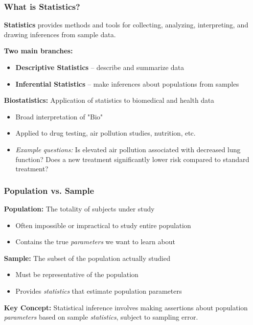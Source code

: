 \documentclass{beamer}
\begin{document}
\begin{frame}
\frametitle{What is Statistics?}
\textbf{Statistics} provides methods and tools for collecting, analyzing, interpreting, and drawing inferences from sample data.

\vspace{0.5cm}
\textbf{Two main branches:}
\begin{itemize}
\item \textbf{Descriptive Statistics} -- describe and summarize data
\item \textbf{Inferential Statistics} -- make inferences about populations from samples
\end{itemize}

\vspace{0.5cm}
\textbf{Biostatistics:} Application of statistics to biomedical and health data
\begin{itemize}
\item Broad interpretation of "Bio"
\item Applied to drug testing, air pollution studies, nutrition, etc.
\item \textit{Example questions:} Is elevated air pollution associated with decreased lung function? Does a new treatment significantly lower risk compared to standard treatment?
\end{itemize}
\end{frame}

\begin{frame}
\frametitle{Population vs. Sample}
\textbf{Population:} The totality of subjects under study
\begin{itemize}
\item Often impossible or impractical to study entire population
\item Contains the true \textit{parameters} we want to learn about
\end{itemize}

\vspace{0.5cm}
\textbf{Sample:} The subset of the population actually studied
\begin{itemize}
\item Must be representative of the population
\item Provides \textit{statistics} that estimate population parameters
\end{itemize}

\vspace{0.5cm}
\textbf{Key Concept:} Statistical inference involves making assertions about population \textit{parameters} based on sample \textit{statistics}, subject to sampling error.
\end{frame}
\end{document}
